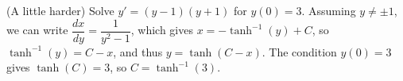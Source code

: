 {(A little harder) Solve $y' = (y-1)(y+1)$ for $y(0)=3$.}
{Assuming $y\neq \pm 1$, we can write $\dfrac{dx}{dy} = \dfrac{1}{y^2-1}$, which gives $x = -\tanh^{-1}(y)+C$, so $\tanh^{-1}(y) = C-x$, and thus $y=\tanh(C-x)$. The condition $y(0)=3$ gives $\tanh(C)=3$, so $C=\tanh^{-1}(3)$.}